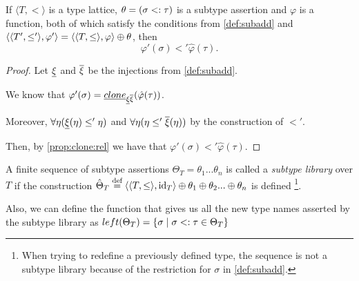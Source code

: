 \documentclass[main.tex]{subfiles}
\begin{document}
\begin{lemma}
    \label{lemma:subadd:phi}
    If $\langle T, \less \rangle$ is a type lattice, $\theta = (\sigma <: \tau)$
    is a subtype assertion and $\varphi$ is a function, both of which satisfy the conditions from \cref{def:subadd}
    and $\langle \langle T', \leq' \rangle, \varphi' \rangle
    = \langle \langle T, \leq \rangle, \varphi \rangle \oplus \theta$, then
    \[ \varphi'(\sigma) \less' \hat{\varphi}(\tau). \]
\end{lemma}
\begin{proof}
    Let $\underline{\xi}$ and $\overline{\xi}$ be the injections from \cref{def:subadd}.

    We know that $\varphi'(\sigma) = \underline{clone}_{\underline{\xi} \overline{\xi}}(\hat{\varphi}(\tau))$.

    Moreover,
    $\forall \eta (\underline{\xi}(\eta) \leq' \eta)$ and
    $\forall \eta (\eta \leq' \overline{\xi}(\eta))$ by the construction of
    $\less'$.

    Then, by \cref{prop:clone:rel} we have that $\varphi'(\sigma) \less'
    \hat{\varphi}(\tau)$.
\end{proof}

\begin{defn}
    A finite sequence of subtype assertions
    $\Theta_T = \theta_1 ... \theta_n$ is called a \emph{subtype library} over $T$
    if the construction $\hat{\Theta}_T \overset{\text{\scriptsize def}}{=} \langle \langle T, \leq \rangle, \mathrm{id}_T \rangle \oplus \theta_1 \oplus \theta_2 ... \oplus \theta_n$
    is defined \footnote{
        When trying to redefine a previously defined type, the sequence is not
        a subtype library because of the restriction for $\sigma$
        in \cref{def:subadd}.
    }.

    Also, we can define the function that gives us all the new type names
    asserted by the subtype library as
    $left(\Theta_T) = \{ \sigma \mid \sigma <: \tau \in \Theta_T \}$
\end{defn}
\end{document}
